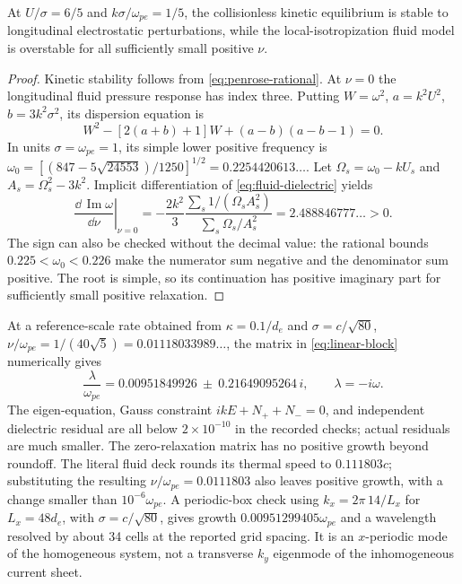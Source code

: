 \begin{proposition}
\label{prop:stability-counterexample}
At $U/\sigma=6/5$ and $k\sigma/\omega_{pe}=1/5$, the collisionless kinetic
equilibrium is stable to longitudinal electrostatic perturbations, while the
local-isotropization fluid model is overstable
for all sufficiently small positive $\nu$.
\end{proposition}
\begin{proof}
Kinetic stability follows from \eqref{eq:penrose-rational}.
At $\nu=0$ the longitudinal fluid pressure response has index three.
Putting $W=\omega^2$, $a=k^2U^2$, $b=3k^2\sigma^2$, its dispersion equation is
\begin{equation}
 W^2-[2(a+b)+1]W+(a-b)(a-b-1)=0.
 \label{eq:ideal-dispersion}
\end{equation}
In units $\sigma=\omega_{pe}=1$, its simple lower positive frequency is
$\omega_0=[(847-5\sqrt{24553})/1250]^{1/2}=0.2254420613\ldots$.
Let $\Omega_s=\omega_0-kU_s$ and $A_s=\Omega_s^2-3k^2$.
Implicit differentiation of \eqref{eq:fluid-dielectric} yields
\begin{equation}
 \left.\frac{\dd\,\operatorname{Im}\omega}{\dd\nu}\right|_{\nu=0}
 =-\frac{2k^2}{3}
 \frac{\sum_s1/(\Omega_sA_s^2)}
      {\sum_s\Omega_s/A_s^2}
 =2.488846777\ldots>0.
 \label{eq:small-nu-slope}
\end{equation}
The sign can also be checked without the decimal value: the rational bounds
$0.225<\omega_0<0.226$ make the numerator sum negative and the denominator
sum positive. The root is simple, so its continuation has positive imaginary
part for sufficiently small positive relaxation.
\end{proof}

At a reference-scale rate obtained from $\kappa=0.1/d_e$ and
$\sigma=c/\sqrt{80}$,
$\nu/\omega_{pe}=1/(40\sqrt5)=0.01118033989\ldots$,
the matrix in \eqref{eq:linear-block} numerically gives
\begin{equation}
 \frac{\lambda}{\omega_{pe}}
 =0.00951849926\ \pm\ 0.21649095264\,i,
 \qquad \lambda=-i\omega.
 \label{eq:mode-result}
\end{equation}
The eigen-equation, Gauss constraint
$ikE+N_++N_-=0$, and independent dielectric residual are all below
$2\times10^{-10}$ in the recorded checks; actual residuals are much smaller.
The zero-relaxation matrix has no positive growth beyond roundoff.
The literal fluid deck rounds its thermal speed to $0.111803c$; substituting
the resulting $\nu/\omega_{pe}=0.0111803$ also leaves positive growth, with a
change smaller than $10^{-6}\omega_{pe}$.
A periodic-box check using $k_x=2\pi\,14/L_x$ for $L_x=48d_e$, with
$\sigma=c/\sqrt{80}$, gives growth $0.00951299405\omega_{pe}$ and a wavelength
resolved by about 34 cells at the reported grid spacing.
It is an $x$-periodic mode of the homogeneous system, not a transverse
$k_y$ eigenmode of the inhomogeneous current sheet.

